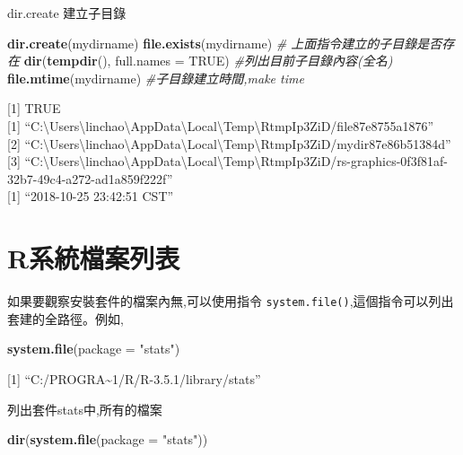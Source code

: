 \documentclass[]{book}
\newenvironment{Shaded}{\begin{snugshade}}{\end{snugshade}}
\newcommand{\KeywordTok}[1]{\textcolor[rgb]{0.13,0.29,0.53}{\textbf{#1}}}
\newcommand{\DataTypeTok}[1]{\textcolor[rgb]{0.13,0.29,0.53}{#1}}
\newcommand{\StringTok}[1]{\textcolor[rgb]{0.31,0.60,0.02}{#1}}
\newcommand{\CommentTok}[1]{\textcolor[rgb]{0.56,0.35,0.01}{\textit{#1}}}
\newcommand{\OtherTok}[1]{\textcolor[rgb]{0.56,0.35,0.01}{#1}}
\newcommand{\NormalTok}[1]{#1}
\theoremstyle{definition}
\theoremstyle{definition}
\theoremstyle{definition}
\theoremstyle{remark}
\begin{document}
dir.create 建立子目錄

\begin{Shaded}
\begin{Highlighting}[]
\KeywordTok{dir.create}\NormalTok{(mydirname)  }
\KeywordTok{file.exists}\NormalTok{(mydirname) }\CommentTok{# 上面指令建立的子目錄是否存在}
\KeywordTok{dir}\NormalTok{(}\KeywordTok{tempdir}\NormalTok{(), }\DataTypeTok{full.names =} \OtherTok{TRUE}\NormalTok{) }\CommentTok{#列出目前子目錄內容(全名)}
\KeywordTok{file.mtime}\NormalTok{(mydirname) }\CommentTok{#子目錄建立時間,make time}
\end{Highlighting}
\end{Shaded}

{[}1{]} TRUE\\
{[}1{]}
``C:\textbackslash{}Users\textbackslash{}linchao\textbackslash{}AppData\textbackslash{}Local\textbackslash{}Temp\textbackslash{}RtmpIp3ZiD/file87e8755a1876''\\
{[}2{]}
``C:\textbackslash{}Users\textbackslash{}linchao\textbackslash{}AppData\textbackslash{}Local\textbackslash{}Temp\textbackslash{}RtmpIp3ZiD/mydir87e86b51384d''\\
{[}3{]}
``C:\textbackslash{}Users\textbackslash{}linchao\textbackslash{}AppData\textbackslash{}Local\textbackslash{}Temp\textbackslash{}RtmpIp3ZiD/rs-graphics-0f3f81af-32b7-49c4-a272-ad1a859f222f''\\
{[}1{]} ``2018-10-25 23:42:51 CST''

\section{R系統檔案列表}\label{r}

如果要觀察安裝套件的檔案內無,可以使用指令
\texttt{system.file()},這個指令可以列出套建的全路徑。例如,

\begin{Shaded}
\begin{Highlighting}[]
\KeywordTok{system.file}\NormalTok{(}\DataTypeTok{package =} \StringTok{"stats"}\NormalTok{)}
\end{Highlighting}
\end{Shaded}

{[}1{]} ``C:/PROGRA\textasciitilde{}1/R/R-3.5.1/library/stats''

列出套件stats中,所有的檔案

\begin{Shaded}
\begin{Highlighting}[]
\KeywordTok{dir}\NormalTok{(}\KeywordTok{system.file}\NormalTok{(}\DataTypeTok{package =} \StringTok{"stats"}\NormalTok{))}
\end{Highlighting}
\end{Shaded}
\end{document}
